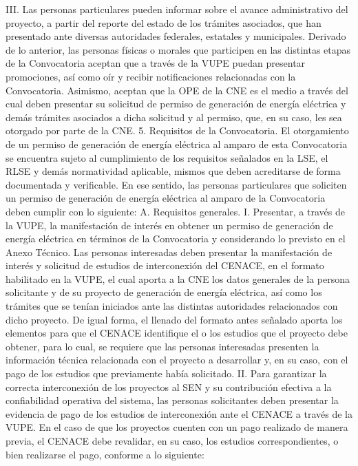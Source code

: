 III.	Las personas particulares pueden informar sobre el avance administrativo del proyecto, a partir del reporte del estado de los trámites asociados, que han presentado ante diversas autoridades federales, estatales y municipales.
Derivado de lo anterior, las personas físicas o morales que participen en las distintas etapas de la Convocatoria aceptan que a través de la VUPE puedan presentar promociones, así como oír y recibir notificaciones relacionadas con la Convocatoria. Asimismo, aceptan que la OPE de la CNE es el medio a través del cual deben presentar su solicitud de permiso de generación de energía eléctrica y demás trámites asociados a dicha solicitud y al permiso, que, en su caso, les sea otorgado por parte de la CNE.
5. Requisitos de la Convocatoria.
El otorgamiento de un permiso de generación de energía eléctrica al amparo de esta Convocatoria se encuentra sujeto al cumplimiento de los requisitos señalados en la LSE, el RLSE y demás normatividad aplicable, mismos que deben acreditarse de forma documentada y verificable.
En ese sentido, las personas particulares que soliciten un permiso de generación de energía eléctrica al amparo de la Convocatoria deben cumplir con lo siguiente:
A. Requisitos generales.
I.	Presentar, a través de la VUPE, la manifestación de interés en obtener un permiso de generación de energía eléctrica en términos de la Convocatoria y considerando lo previsto en el Anexo Técnico.
	Las personas interesadas deben presentar la manifestación de interés y solicitud de estudios de interconexión del CENACE, en el formato habilitado en la VUPE, el cual aporta a la CNE los datos generales de la persona solicitante y de su proyecto de generación de energía eléctrica, así como los trámites que se tenían iniciados ante las distintas autoridades relacionados con dicho proyecto.
	De igual forma, el llenado del formato antes señalado aporta los elementos para que el CENACE identifique el o los estudios que el proyecto debe obtener, para lo cual, se requiere que las personas interesadas presenten la información técnica relacionada con el proyecto a desarrollar y, en su caso, con el pago de los estudios que previamente había solicitado.
II.	Para garantizar la correcta interconexión de los proyectos al SEN y su contribución efectiva a la confiabilidad operativa del sistema, las personas solicitantes deben presentar la evidencia de pago de los estudios de interconexión ante el CENACE a través de la VUPE. En el caso de que los proyectos cuenten con un pago realizado de manera previa, el CENACE debe revalidar, en su caso, los estudios correspondientes, o bien realizarse el pago, conforme a lo siguiente:
